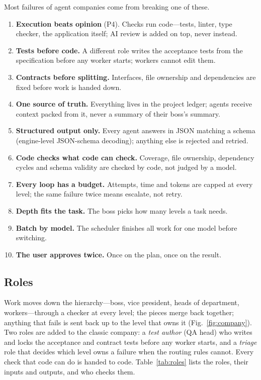 Most failures of agent companies come from breaking one of these.
\begin{enumerate}
\item \textbf{Execution beats opinion} (P4). Checks run code---tests, linter, type checker, the application itself; AI review is added on top, never instead.
\item \textbf{Tests before code.} A different role writes the acceptance tests from the specification before any worker starts; workers cannot edit them.
\item \textbf{Contracts before splitting.} Interfaces, file ownership and dependencies are fixed before work is handed down.
\item \textbf{One source of truth.} Everything lives in the project ledger; agents receive context packed from it, never a summary of their boss's summary.
\item \textbf{Structured output only.} Every agent answers in JSON matching a schema (engine-level JSON-schema decoding); anything else is rejected and retried.
\item \textbf{Code checks what code can check.} Coverage, file ownership, dependency cycles and schema validity are checked by code, not judged by a model.
\item \textbf{Every loop has a budget.} Attempts, time and tokens are capped at every level; the same failure twice means escalate, not retry.
\item \textbf{Depth fits the task.} The boss picks how many levels a task needs.
\item \textbf{Batch by model.} The scheduler finishes all work for one model before switching.
\item \textbf{The user approves twice.} Once on the plan, once on the result.
\end{enumerate}

\subsection{Roles}

Work moves down the hierarchy---boss, vice president, heads of department, workers---through a checker at every level; the pieces merge back together; anything that fails is sent back up to the level that owns it (Fig.~\ref{fig:company}). Two roles are added to the classic company: a \emph{test author} (QA head) who writes and locks the acceptance and contract tests before any worker starts, and a \emph{triage} role that decides which level owns a failure when the routing rules cannot. Every check that code can do is handed to code. Table~\ref{tab:roles} lists the roles, their inputs and outputs, and who checks them.

